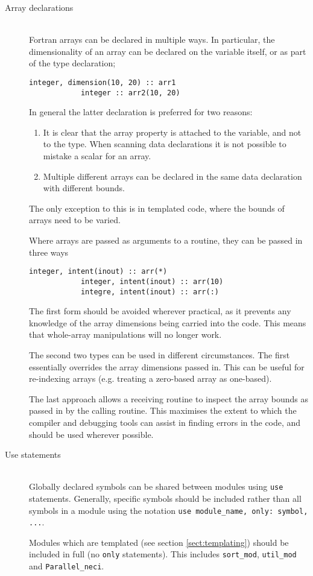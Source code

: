 \documentclass[a4paper,notitlepage]{scrreprt}
\newcommand\headitem[1]{\needspace{1.5\baselineskip}\item[{\boldmath #1 \nopagebreak}] \hfill \\ \nopagebreak}
\let\code\lstinline
\begin{document}
\begin{description}
	
	\headitem{Array declarations}
		Fortran arrays can be declared in multiple ways. In particular, the
		dimensionality of an array can be declared on the variable itself,
		or as part of the type declaration;
		\begin{lstlisting}[gobble=8]
			integer, dimension(10, 20) :: arr1
			integer :: arr2(10, 20)
		\end{lstlisting}
		In general the latter declaration is preferred for two reasons:
		\begin{enumerate}
			\item
				It is clear that the array property is attached to the
				variable, and not to the type. When scanning data declarations
				it is not possible to mistake a scalar for an array.
			\item
				Multiple different arrays can be declared in the same data
				declaration with different bounds.
		\end{enumerate}
		The only exception to this is in templated code, where the bounds of
		arrays need to be varied.
		
		Where arrays are passed as arguments to a routine, they can be
		passed in three ways
		\begin{lstlisting}[gobble=8]
			integer, intent(inout) :: arr(*)
			integer, intent(inout) :: arr(10)
			integre, intent(inout) :: arr(:)
		\end{lstlisting}
		The first form should be avoided wherever practical, as it prevents
		any knowledge of the array dimensions being carried into the code.
		This means that whole-array manipulations will no longer work.
		
		The second two types can be used in different circumstances. The first
		essentially overrides the array dimensions passed in. This can be
		useful for re-indexing arrays (e.g. treating a zero-based array as
		one-based).
		
		The last approach allows a receiving routine to inspect the array
		bounds as passed in by the calling routine. This maximises the extent
		to which the compiler and debugging tools can assist in finding
		errors in the code, and should be used wherever possible.

	\headitem{Use statements}
		Globally declared symbols can be shared between modules using
		\code{use} statements. Generally, specific symbols should be
		included rather than all symbols in a module using the notation
		\code{use module_name, only: symbol, ...}.
		
		Modules which are templated (see section \ref{sect:templating}) should
		be included in full (no \code{only} statements). This includes
		\code{sort_mod}, \code{util_mod} and
		\code{Parallel_neci}.
		

\end{description}
\end{document}
